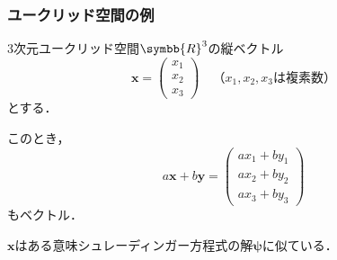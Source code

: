 \documentclass[
    10pt,
    ]{sotsu-beamer}
\begin{document}
\begin{frame}
    \frametitle{ユークリッド空間の例}

    3次元ユークリッド空間$\symbb{R}^3$の縦ベクトル
    \begin{equation*}
        \symbf{x} = 
        \begin{pmatrix}
            x_1 \\ x_2  \\ x_3
        \end{pmatrix}
        \quad
        \text{（$x_1, x_2, x_3$は複素数）}
    \end{equation*}
    とする．

    このとき，
    \begin{equation*}
        a \symbf{x} + b \symbf{y}
        = \begin{pmatrix}
            a x_1 + b y_1  \\
            a x_2 + b y_2  \\
            a x_3 + b y_3
        \end{pmatrix}
    \end{equation*}
    もベクトル．

    \pause

    $\symbf{x}$はある意味\alert{シュレーディンガー方程式の解$\symbf{\psi}$に似ている}．

\end{frame}
\end{document}
